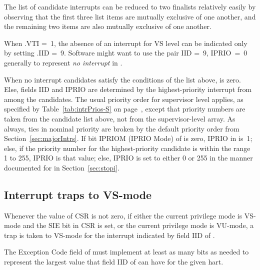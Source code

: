 \begin{commentary}
The list of candidate interrupts can be reduced to two finalists
relatively easily by observing that the first three list items are
mutually exclusive of one another, and the remaining two items are also
mutually exclusive of one another.
\end{commentary}

\begin{commentary}
When\/ .VTI =~1, the absence of an interrupt for VS level
can be indicated only by setting\/ .IID =~9.
Software might want to use the pair IID =~9, IPRIO~=~0 generally to
represent\/ \emph{no interrupt} in .
\end{commentary}

When no interrupt candidates satisfy the conditions of the list above,
 is zero.
Else,  fields IID and IPRIO are determined by the
highest-priority interrupt from among the candidates.
The usual priority order for supervisor level applies, as specified by
Table~\ref{tab:intrPrios-S} on page~\pageref{tab:intrPrios-S}, except
that priority numbers are taken from the candidate list above, not from
the supervisor-level  array.
As always, ties in nominal priority are broken by the default priority
order from Section~\ref{sec:majorIntrs}.
If bit IPRIOM (IPRIO Mode) of  is zero,
IPRIO in  is~1;
else, if the priority number for the highest-priority candidate is within the
range 1 to 255, IPRIO is that value;
else, IPRIO is set to either 0 or 255 in the manner documented
for  in Section~\ref{sec:stopi}.

\subsection{Interrupt traps to \mbox{VS-mode}}

Whenever the value of CSR  is not zero, if either the current
privilege mode is \mbox{VS-mode} and the SIE bit in CSR 
is set, or the current privilege mode is \mbox{VU-mode}, a trap is
taken to \mbox{VS-mode} for the interrupt indicated by field IID of
.

The Exception Code field of  must implement at least as
many bits as needed to represent the largest value that field IID of
 can have for the given hart.

